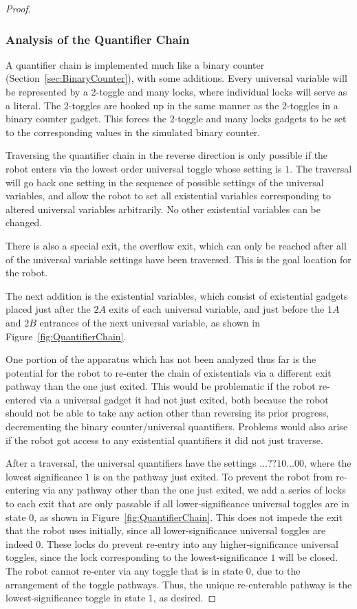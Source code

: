 \begin{proof}
\subsubsection{Analysis of the Quantifier Chain}
\label{sec:AnalysisQuantifierChain}

A quantifier chain is implemented much like a binary counter (Section~\ref{sec:BinaryCounter}), with some additions. Every universal variable will be represented by a 2-toggle and many locks, where individual locks will serve as a literal. The 2-toggles are hooked up in the same manner as the 2-toggles in a binary counter gadget. This forces the 2-toggle and many locks gadgets to be set to the corresponding values in the simulated binary counter.

Traversing  the quantifier chain in the reverse direction is only possible if the robot enters
via the lowest order universal toggle whose setting is $1$. The traversal will go back one setting in the
sequence of possible settings of the universal variables, and allow the robot to set all existential variables
corresponding to altered universal variables arbitrarily. No other existential variables can be changed.

There is also a special exit, the overflow exit, which can only be
reached after all of the universal variable settings have been traversed. This is the goal location for the robot.

The next addition is the existential variables, which consist of existential gadgets placed just after the $2A$
exits of each universal variable,
and just before the $1A$ and $2B$ entrances of the next universal variable, as shown
in Figure~\ref{fig:QuantifierChain}.

One portion of the apparatus which has not been analyzed thus far is the potential for the robot to re-enter the chain of existentials
via a different exit pathway than the one just exited. This would be problematic if the robot re-entered via a universal gadget it had not just exited,
both because the robot should not be able to take any action other than reversing its prior progress, 
decrementing the binary counter/universal quantifiers. Problems would also arise if the robot got access to any existential quantifiers 
it did not just traverse.

After a traversal, the universal quantifiers have the settings $\ldots??10\ldots00$, where the lowest significance $1$ is 
on the pathway just exited.
To prevent the robot from re-entering via any pathway other than the one just exited, we add a series of locks to each exit that are only passable
if all lower-significance universal toggles are in state $0$, as shown in Figure~\ref{fig:QuantifierChain}.
This does not impede the exit that the robot uses initially, since all
lower-significance universal toggles are indeed $0$. These locks do prevent re-entry into any higher-significance universal toggles, since the
lock corresponding to the lowest-significance $1$ will be closed. The robot cannot re-enter via any toggle that is in state $0$,
due to the arrangement of the toggle pathways. Thus, the unique re-enterable pathway is the lowest-significance toggle in state $1$, as desired.

\end{proof}




